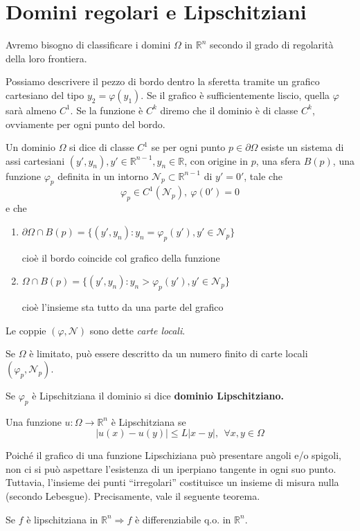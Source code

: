 \documentclass[10pt,a4paper,twoside,openright]{book}
\begin{document}
\section{Domini regolari e Lipschitziani}

Avremo bisogno di classificare i domini $\Omega $ in $\mathbb{R}^{n}$ secondo il grado di regolarità della loro frontiera.

Possiamo descrivere il pezzo di bordo dentro la sferetta tramite un grafico cartesiano del tipo $y_{2} =\varphi (y_{1})$. Se il grafico è sufficientemente liscio, quella $\varphi $ sarà almeno $C^{1}$. Se la funzione è $C^{k}$ diremo che il dominio è di classe $C^{k}$, ovviamente per ogni punto del bordo.


\begin{definition}
	Un dominio $\Omega $ si dice di classe $C^{1}$ se per ogni punto $p\in \partial \Omega $ esiste un sistema di assi cartesiani $(y',y_{n}),y'\in \mathbb{R}^{n-1},y_{n} \in \mathbb{R}$, con origine in $p$, una sfera $B(p)$, una funzione $\varphi _{p}$ definita in un intorno $\mathcal{N}_{p} \subset \mathbb{R}^{n-1}$ di $y'=0'$, tale che
	\begin{equation*}
	\varphi _{p} \in C^{1}(\mathcal{N}_{p}),\ \varphi (0') =0
	\end{equation*}
	e che
	\begin{enumerate}
	\item $\partial \Omega \cap B(p) =\{(y',y_{n}) :y_{n} =\varphi _{p}(y'),y'\in \mathcal{N}_{p}\}$

	cioè il bordo coincide col grafico della funzione
	\item $\Omega \cap B(p) =\{(y',y_{n}) :y_{n}  >\varphi _{p}(y'),y'\in \mathcal{N}_{p}\}$

	cioè l'insieme sta tutto da una parte del grafico
	\end{enumerate}
\end{definition}

Le coppie $( \varphi,\mathcal{N})$ sono dette \textit{carte locali}.

Se $\Omega $ è limitato, può essere descritto da un numero finito di carte locali $( \varphi _{p},\mathcal{N}_{p})$.

Se $\varphi _{p}$ è Lipschitziana il dominio si dice \textbf{dominio Lipschitziano.}
\begin{definition}
 Una funzione $u:\Omega \rightarrow \mathbb{R}^{n}$ è Lipschitziana se
\begin{equation*}
| u(x) -u(y)| \leqslant L| x-y|,\ \ \forall x,y\in \Omega 
\end{equation*}
\end{definition}
Poiché il grafico di una funzione Lipschiziana può presentare angoli e/o spigoli, non ci si può aspettare l’esistenza di un iperpiano tangente in ogni suo punto. Tuttavia, l’insieme dei punti ``irregolari'' costituisce un insieme di misura nulla (secondo Lebesgue). Precisamente, vale il seguente teorema.
\begin{theorem}
[di Rademacher] Se $f$ è lipschitziana in $\mathbb{R}^{n} \Rightarrow f$ è differenziabile q.o. in $\mathbb{R}^{n}$.
\end{theorem}
\end{document}
